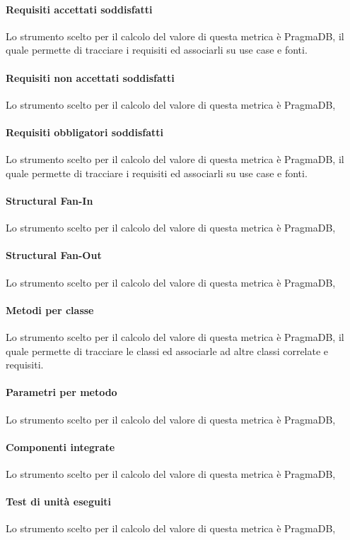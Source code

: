 \paragraph{Requisiti accettati soddisfatti}
Lo strumento scelto per il calcolo del valore di questa metrica è PragmaDB, il quale permette di tracciare i requisiti ed associarli su use case e fonti.
\paragraph{Requisiti non accettati soddisfatti}
Lo strumento scelto per il calcolo del valore di questa metrica è PragmaDB,
\paragraph{Requisiti obbligatori soddisfatti}
Lo strumento scelto per il calcolo del valore di questa metrica è PragmaDB, il quale permette di tracciare i requisiti ed associarli su use case e fonti.
\paragraph{Structural Fan-In}
Lo strumento scelto per il calcolo del valore di questa metrica è PragmaDB,
\paragraph{Structural Fan-Out}
Lo strumento scelto per il calcolo del valore di questa metrica è PragmaDB,
\paragraph{Metodi per classe}
Lo strumento scelto per il calcolo del valore di questa metrica è PragmaDB, il quale permette di tracciare le classi ed associarle ad altre classi correlate e requisiti.
\paragraph{Parametri per metodo}
Lo strumento scelto per il calcolo del valore di questa metrica è PragmaDB,
\paragraph{Componenti integrate}
Lo strumento scelto per il calcolo del valore di questa metrica è PragmaDB,
\paragraph{Test di unità eseguiti}
Lo strumento scelto per il calcolo del valore di questa metrica è PragmaDB,
